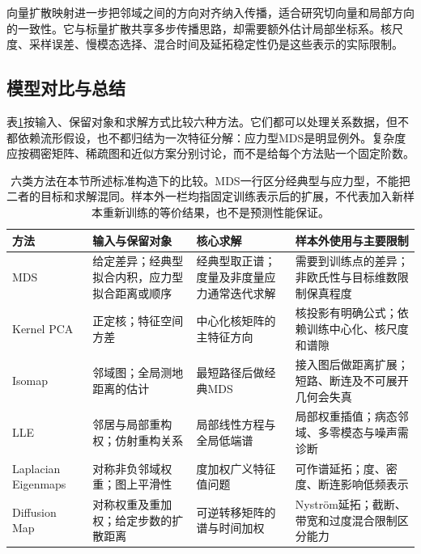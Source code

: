 向量扩散映射进一步把邻域之间的方向对齐纳入传播，适合研究切向量和局部方向的一致性。它与标量扩散共享多步传播思路，却需要额外估计局部坐标系。核尺度、采样误差、慢模态选择、混合时间及延拓稳定性仍是这些表示的实际限制。

\subsection{模型对比与总结}
\label{sec:dim-manifold-comparison}

表\ref{tab:dim-manifold-comparison}按输入、保留对象和求解方式比较六种方法。它们都可以处理关系数据，但不都依赖流形假设，也不都归结为一次特征分解：应力型MDS是明显例外。复杂度应按稠密矩阵、稀疏图和近似方案分别讨论，而不是给每个方法贴一个固定阶数。

\begin{table}[htbp]
  \centering
  \small
  \begin{tabularx}{\linewidth}{@{}>{\raggedright\arraybackslash}p{22mm}XXX@{}}
    \toprule
    方法 & 输入与保留对象 & 核心求解 & 样本外使用与主要限制 \\
    \midrule
    MDS & 给定差异；经典型拟合内积，应力型拟合距离或顺序
      & 经典型取正谱；度量及非度量应力通常迭代求解
      & 需要到训练点的差异；非欧氏性与目标维数限制保真程度 \\
    Kernel PCA & 正定核；特征空间方差
      & 中心化核矩阵的主特征方向
      & 核投影有明确公式；依赖训练中心化、核尺度和谱隙 \\
    Isomap & 邻域图；全局测地距离的估计
      & 最短路径后做经典MDS
      & 接入图后做距离扩展；短路、断连及不可展开几何会失真 \\
    LLE & 邻居与局部重构权；仿射重构关系
      & 局部线性方程与全局低端谱
      & 局部权重插值；病态邻域、多零模态与噪声需诊断 \\
    Laplacian Eigenmaps & 对称非负邻域权重；图上平滑性
      & 度加权广义特征值问题
      & 可作谱延拓；度、密度、断连影响低频表示 \\
    Diffusion Map & 对称权重及重加权；给定步数的扩散距离
      & 可逆转移矩阵的谱与时间加权
      & Nystr\"om延拓；截断、带宽和过度混合限制区分能力 \\
    \bottomrule
  \end{tabularx}
  \caption{六类方法在本节所述标准构造下的比较。MDS一行区分经典型与应力型，不能把二者的目标和求解混同。样本外一栏均指固定训练表示后的扩展，不代表加入新样本重新训练的等价结果，也不是预测性能保证。}
  \label{tab:dim-manifold-comparison}
\end{table}

